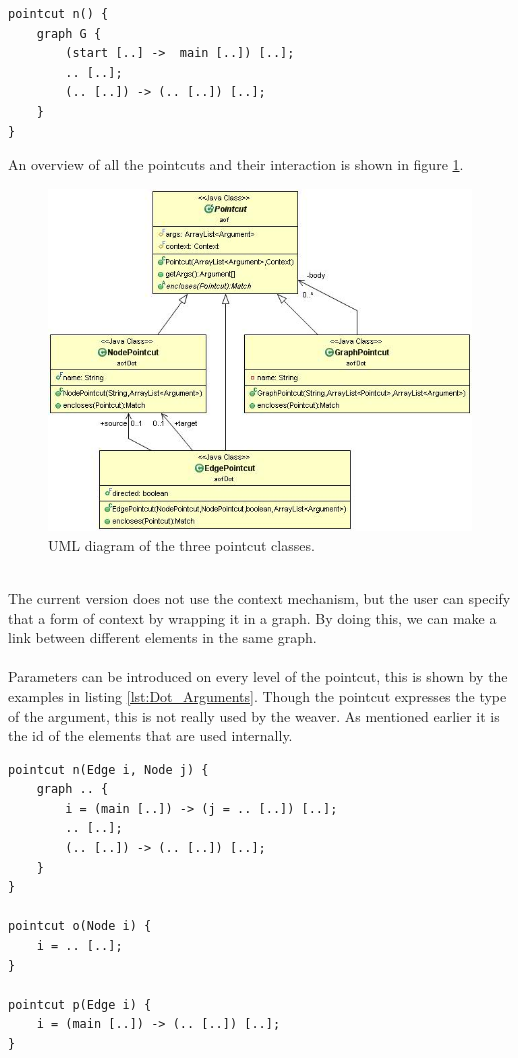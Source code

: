 \documentclass[a4paper]{report}
\begin{document}
\begin{lstlisting}[caption=A graph pointcut matching any graph G with an edge from start to main, label=lst:Dot_GraphPointcut]
pointcut n() {
	graph G {
		(start [..] ->  main [..]) [..];
		.. [..];
		(.. [..]) -> (.. [..]) [..];
	}
}
\end{lstlisting}
An overview of all the pointcuts and their interaction is shown in figure \ref{fig:DotPointcuts}.
\begin{figure}
\centering
\includegraphics[scale=0.6]{images/AOFDot/DotPointcuts.jpg}
\caption{UML diagram of the three pointcut classes.}
\label{fig:DotPointcuts}
\end{figure}
\\
The current version does not use the context mechanism, but the user can specify that a form of context by wrapping it in a graph. By doing this, we can make a link between different elements in the same graph.\\
\\
Parameters can be introduced on every level of the pointcut, this is shown by the examples in listing \ref{lst:Dot_Arguments}. Though the pointcut expresses the type of the argument, this is not really used by the weaver. As mentioned earlier it is the id of the elements that are used internally.
\begin{lstlisting}[caption=Examples showing the use of arguments, label=lst:Dot_Arguments]
pointcut n(Edge i, Node j) {
	graph .. {
		i = (main [..]) -> (j = .. [..]) [..];
		.. [..];
		(.. [..]) -> (.. [..]) [..];
	}
}

pointcut o(Node i) {
	i = .. [..];
}

pointcut p(Edge i) {
	i = (main [..]) -> (.. [..]) [..];
}
\end{lstlisting}
\end{document}
